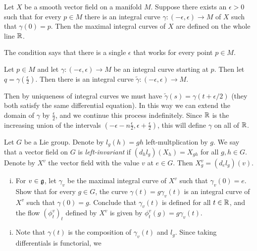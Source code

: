 \documentclass[11pt, english]{article}
\begin{document}
\begin{exc}
Let $X$ be a smooth vector field on a manifold $M$. Suppose there exists an $\epsilon > 0$ such that for every $p \in M$ there is an integral curve $\gamma:(-\epsilon, \epsilon) \to M$ of $X$ such that $\gamma(0)=p$. Then the maximal integral curves of $X$ are defined on the whole line $\mathbb{R}$.
\end{exc}

\begin{sol}
The condition says that there is a single $\epsilon$ that works for every point $p \in M$.

Let $p \in M$ and let $\gamma:(-\epsilon,\epsilon) \to M$ be an integral curve starting at $p$. Then let $q=\gamma(\frac \epsilon 2)$. Then there is an integral curve $\tilde \gamma:(-\epsilon, \epsilon) \to M$. 

Then by uniqueness of integral curves we must have $\tilde \gamma(s)=\gamma(t+\epsilon/2)$ (they both satisfy the same differential equation). In this way we can extend the domain of $\gamma$ by $\frac \epsilon 2$, and we continue this process indefinitely. Since $\mathbb{R}$ is the increasing union of the intervals $(-\epsilon-n \frac \epsilon 2, \epsilon + \frac \epsilon 2)$, this will define $\gamma$ on all of $\mathbb{R}$.
\end{sol}

\begin{exc}
Let $G$ be a Lie group. Denote by $l_g(h)=gh$ left-multplication by $g$. We say that a vector field on $G$ is \emph{left-invariant} if $(d_hl_g)(X_h)=X_{gh}$ for all $g,h \in G$. Denote by $X^v$ the vector field with the value $v$ at $e \in G$. Then $X^v_g = (d_el_g)(v)$. 
\begin{enumerate}[i)]
\item  For $v \in \mathfrak g$, let $\gamma_v$ be the maximal integral curve of $X^v$ such that $\gamma_v(0)=e$. Show that for every $g \in G$, the curve $\gamma(t)=g\gamma_v(t)$ is an integral curve of $X^v$ such that $\gamma(0)=g$. Conclude that $\gamma_v(t)$ is defined for all $t \in \mathbb{R}$, and the flow $(\phi_t^v)_t$ defined by $X^v$ is given by $\phi_t^v(g)=g\gamma_v(t)$.
\end{enumerate}
\end{exc}

\begin{sol}
  \begin{enumerate}[i)]
  \item Note that $\gamma(t)$ is the composition of $\gamma_v(t)$ and $l_g$. Since taking differentials is functorial, we 
  \end{enumerate}
\end{sol}
\end{document}
